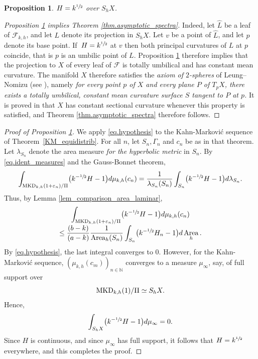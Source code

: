 \documentclass[10pt]{amsart}
\theoremstyle{plain}
\newtheorem{prop}[theorem]{Proposition}
\theoremstyle{definition}
\newcommand{\cF}{{\mathcal F}}
\let\eps\varepsilon
\newcommand{\MKD}{\mathrm{MKD}}
\DeclareMathOperator{\Area}{Area}
\begin{document}
\begin{prop}\label{p.tot_asymptotic}
$H=k^{\sfrac{1}{2}}$ over $S_hX$.
\end{prop}

\begin{proof}[Proposition \ref{p.tot_asymptotic} implies Theorem \ref{thm.asymptotic_spectra}]
Indeed, let $\hat L$ be a leaf of $\cF_{k,h}$, and let $L$ denote its projection in $S_hX$. Let $v$ be a point of $\hat L$, and let $p$ denote its base point. If~$H=k^{\sfrac{1}{2}}$ at $v$ then both principal curvatures of $L$ at $p$ coincide, that is $p$ is an umbilic point of $L$. Proposition \ref{p.tot_asymptotic} therefore implies that the projection to $X$ of every leaf of $\cF$ is totally umbilical and has constant mean curvature. The manifold $X$ therefore satisfies the \emph{axiom of $2$-spheres} of Leung--Nomizu (see \cite{Leung_Nomizu}), namely \emph{for every point $p$ of $X$ and every plane $P$ of $T_pX$, there exists a totally umbilical, constant mean curvature surface $S$ tangent to $P$ at $p$.} It is proved in \cite{Leung_Nomizu} that $X$ has constant sectional curvature whenever this property is satisfied, and Theorem \ref{thm.asymptotic_spectra} therefore follows.
\end{proof}

\begin{proof}[Proof of Proposition \ref{p.tot_asymptotic}] We apply \eqref{eq.hypothesis} to the Kahn-Markovi\'c sequence of Theo\-rem~\ref{KM_equidistrib}. For all $n$, let $S_n,\Gamma_n$ and $c_n$ be as in that theorem. Let $\lambda_{S_n}$ denote the area measure \emph{for the hyperbolic metric} in $S_n$. By \eqref{eq.ident_measures} and the Gauss-Bonnet theorem,
\begin{equation*}
\int_{\MKD_{k,h}(1+\eps_n)/\Pi}\bigl(k^{-\sfrac{1}{2}}H-1\bigr)d\mu_{k,h}(c_n)=
\frac{1}{\lambda_{S_n}(S_n)}\int_{S_n}\bigl(k^{-\sfrac{1}{2}}H-1\bigr)d\lambda_{S_n}.
\end{equation*}
Thus, by Lemma \ref{lem_comparison_area_laminar},\vspace*{-3pt}
\begin{multline*}
\int_{\MKD_{k,h}(1+\eps_n)/\Pi}\bigl(k^{-\sfrac{1}{2}}H-1\bigr)d\mu_{k,h}(c_n)\\[-3pt]
\leq\frac{(b-k)}{(a-k)}\frac{1}{\Area_h(S_n)}\int_{S_n}\bigl(k^{-\sfrac{1}{2}}H_n-1\bigr)d\Area_h.
\end{multline*}
By \eqref{eq.hypothesis}, the last integral converges to $0$. However, for the Kahn-Markovi\'c sequence, $(\mu_{k,h}(c_m))_{n\in\mathbb{N}}$ converges to a measure $\mu_\infty$, say, of full support over
\[
\MKD_{k,h}(1)/\Pi\simeq\nobreak S_hX.
\]
Hence,
\begin{equation*}
\int_{S_hX}\bigl(k^{-\sfrac{1}{2}}H-1\bigr)d\mu_\infty = 0.
\end{equation*}
Since $H$ is continuous, and since $\mu_\infty$ has full support, it follows that $H=k^{\sfrac{1}{2}}$ everywhere, and this completes the proof.
\end{proof}
\end{document}
